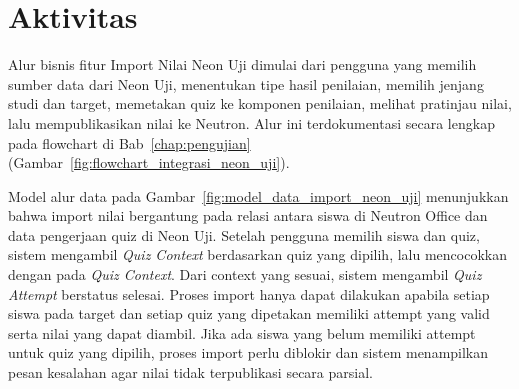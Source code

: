 \section{Aktivitas}
Alur bisnis fitur Import Nilai Neon Uji dimulai dari pengguna yang memilih sumber data dari Neon Uji, menentukan tipe hasil penilaian, memilih jenjang studi dan target, memetakan quiz ke komponen penilaian, melihat pratinjau nilai, lalu mempublikasikan nilai ke Neutron. Alur ini terdokumentasi secara lengkap pada flowchart di Bab~\ref{chap:pengujian} (Gambar~\ref{fig:flowchart_integrasi_neon_uji}).

Model alur data pada Gambar~\ref{fig:model_data_import_neon_uji} menunjukkan bahwa import nilai bergantung pada relasi antara siswa di Neutron Office dan data pengerjaan quiz di Neon Uji. Setelah pengguna memilih siswa dan quiz, sistem mengambil \textit{Quiz Context} berdasarkan quiz yang dipilih, lalu mencocokkan  dengan  pada \textit{Quiz Context}. Dari context yang sesuai, sistem mengambil \textit{Quiz Attempt} berstatus selesai. Proses import hanya dapat dilakukan apabila setiap siswa pada target dan setiap quiz yang dipetakan memiliki attempt yang valid serta nilai yang dapat diambil. Jika ada siswa yang belum memiliki attempt untuk quiz yang dipilih, proses import perlu diblokir dan sistem menampilkan pesan kesalahan agar nilai tidak terpublikasi secara parsial.

